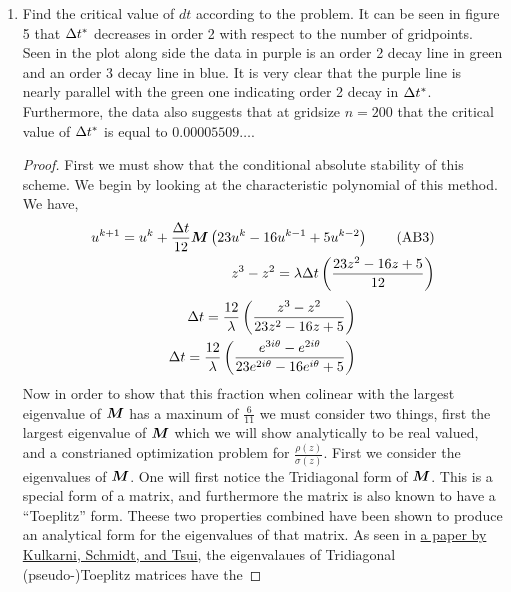 \documentclass{article}
\begin{document}
\begin{enumerate}[label=\alph*)]
    \item Find the critical value of $dt$ according to the problem. It can be
    seen in figure 5 that $\Delta t^*$ decreases in order 2 with respect to the
    number of gridpoints. Seen in the plot along side the data in purple is an
    order 2 decay line in green and an order 3 decay line in blue. It is very
    clear that the purple line is nearly parallel with the green one indicating
    order 2 decay in $\Delta t^*$. Furthermore, the data also suggests that at
    gridsize $n=200$ that the critical value of $\Delta t^*$ is equal to
    $0.00005509\ldots$. 
        \begin{proof}
            First we must show that the conditional absolute stability of this
            scheme. We begin by looking at the characteristic polynomial of this
            method. We have, 
            \begin{align*}
                u^{k+1} = u^{k} + \frac{\Delta t}{12}\boldsymbol{M}\left(23u^{k} - 16u^{k-1}
                + 5u^{k-2}\right)
                \tag{AB3}\\
                z^3 - z^2 = \lambda\Delta t\left(\frac{23z^2 - 16z + 5}{12}\right)
            \end{align*}   
            \begin{align*}
                \Delta t = \frac{12}{\lambda}\left(\frac{z^3 - z^2}{23z^2 - 16z +
                5}\right)\\
                \Delta t = \frac{12}{\lambda}\left(\frac{e^{3i\theta} -
                e^{2i\theta}}{23e^{2i\theta} - 16e^{i\theta} +
                5}\right)
            \end{align*}
            Now in order to show that this fraction when colinear with the
            largest eigenvalue of $\boldsymbol{M}$ has a maxinum of $\frac{6}{11}$ we must consider two things, first
            the largest eigenvalue of $\boldsymbol{M}$ which we will show analytically
            to be real valued, and a constrianed optimization problem for
            $\frac{\rho(z)}{\sigma(z)}$. First we consider the eigenvalues of
            $\boldsymbol{M}$. One will first notice the Tridiagonal form of $\boldsymbol{M}$.
            This is a special form of a matrix, and furthermore the matrix is
            also known to have a ``Toeplitz'' form. Theese two properties combined
            have been shown to produce an analytical form for the eigenvalues of
            that matrix. As seen in
            \href{https://hal.science/hal-01461924/file/KST.pdf}{a paper by Kulkarni, Schmidt, and
            Tsui}, the
            eigenvalaues of Tridiagonal (pseudo-)Toeplitz matrices have the

\end{proof}
\end{enumerate}
\end{document}
